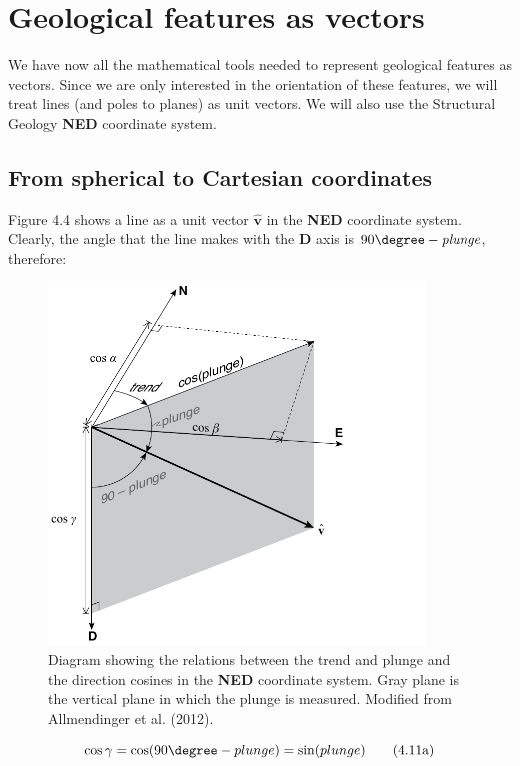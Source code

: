\documentclass[a4paper , 12pt]{book}
\begin{document}
\section{Geological features as vectors}

We have now all the mathematical tools needed to represent geological features as vectors. Since we are only interested in the orientation of these features, we will treat lines (and poles to planes) as unit vectors. We will also use the Structural Geology \textbf{NED} coordinate system.

\subsection{From spherical to Cartesian coordinates}

Figure 4.4 shows a line as a unit vector $\mathbf{\hat{v}}$ in the \textbf{NED} coordinate system. Clearly, the angle that the line makes with the \textbf{D} axis is $90\degree - \textit{plunge}$, therefore:

\begin{figure}[ht]
    \centering
    \includegraphics[width=10cm]{ch4f4.pdf}
    \caption{Diagram showing the relations between the trend and plunge and the direction cosines in the \textbf{NED} coordinate system. Gray plane is the vertical plane in which the plunge is measured. Modified from Allmendinger et al. (2012).}
\end{figure}

\begin{equation}
    \cos\gamma=\cos(90\degree-plunge)=\sin(plunge) \tag{4.11a}
\end{equation}
\end{document}
